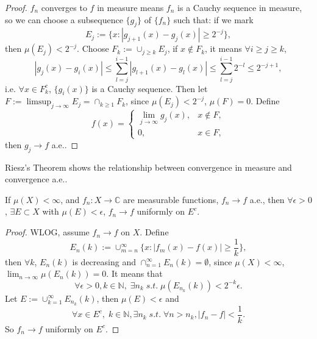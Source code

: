 \begin{proof}
    $f_{n}$ converges to $f$ in measure means $f_{n}$ is a Cauchy 
    sequence in measure, so 
    we can choose a subsequence $\{g_{j}\}$ 
    of $\{f_{n}\}$ such that: if we mark 
    \begin{displaymath}
        E_{j}:=\{x:|g_{j+1}(x)-g_{j}(x)|\ge 2^{-j}\},
    \end{displaymath}
    then $\mu(E_j)<2^{-j}$. 
    Choose $F_{k}:=\cup_{j\ge k}E_{j}$, if 
    $x\notin F_{k}$, it means 
    $\forall i\ge j\ge k$, 
    \begin{displaymath}
        |g_{j}(x)-g_{i}(x)|\le
        \sum_{l=j}^{i-1}|g_{l+1}(x)-g_{l}(x)|
        \le\sum_{l=j}^{i-1}2^{-l}\le2^{-j+1},
    \end{displaymath}
    i.e. $\forall x\in F_{k}^{c}$, 
    $\{g_{i}(x)\}$ is a Cauchy sequence. 
    Then let $F:=\limsup_{j\rightarrow\infty}E_{j}
    =\cap_{k\ge 1}F_{k}$, 
    since $\mu(E_j)<2^{-j}$, 
    $\mu(F)=0$. Define 
    \begin{displaymath}
        f(x)=\left\{
            \begin{array}{rl}
                \lim_{j\rightarrow\infty}g_{j}(x),&x\notin F,\\
                0,&x\in F,
            \end{array}
        \right.
    \end{displaymath}
    then $g_{j}\rightarrow f$ a.e..
\end{proof}
\begin{rem}
    Riesz's Theorem shows the relationship between 
    convergence in measure and convergence a.e..
\end{rem}
\begin{thm}[Egoroff]
    \label{Thm:Egoroff}
    If $\mu(X)<\infty$, and $f_{n}:X\rightarrow\mathbb{C}$ are measurable 
    functions, $f_{n}\rightarrow f$ a.e., then 
    $\forall\epsilon>0$, $\exists E\subset X$ with $\mu(E)<\epsilon$, 
    $f_{n}\rightarrow f$ uniformly on $E^{c}$.
\end{thm}
\begin{proof}
    WLOG, assume $f_{n}\rightarrow f$ on $X$. Define 
    \begin{displaymath}
        E_{n}(k):=\cup_{m=n}^{\infty}\{x:|f_{m}(x)-f(x)|\ge\frac{1}{k}\},
    \end{displaymath}
    then $\forall k$, $E_{n}(k)$ is decreasing and 
    $\cap_{n=1}^{\infty}E_{n}(k)=\emptyset$, since $\mu(X)<\infty$, 
    $\lim_{n\rightarrow\infty}\mu(E_{n}(k))=0$. 
    It means that 
    \begin{displaymath}
        \forall\epsilon>0,k\in\mathbb{N},\;\exists n_{k}\; 
        s.t.\;\mu(E_{n_{k}}(k))<2^{-k}\epsilon.
    \end{displaymath}
    Let $E:=\cup_{k=1}^{\infty}E_{n_k}(k)$, then $\mu(E)<\epsilon$ 
    and 
    \begin{displaymath}
        \forall x\in E^{c},\;k\in\mathbb{N}, 
        \exists n_{k}\;s.t.\;\forall n>n_{k},
        |f_{n}-f|<\frac{1}{k}.
    \end{displaymath}
    So $f_{n}\rightarrow f$ uniformly on $E^{c}$.
\end{proof}
